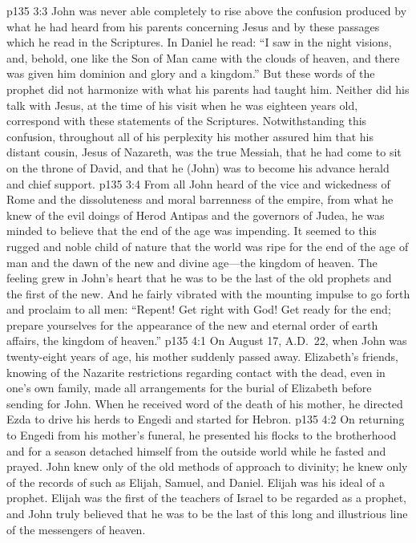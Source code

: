 \pc \vs p135 3:3 John was never able completely to rise above the confusion produced by what he had heard from his parents concerning Jesus and by these passages which he read in the Scriptures. In Daniel he read: “I saw in the night visions, and, behold, one like the Son of Man came with the clouds of heaven, and there was given him dominion and glory and a kingdom.” But these words of the prophet did not harmonize with what his parents had taught him. Neither did his talk with Jesus, at the time of his visit when he was eighteen years old, correspond with these statements of the Scriptures. Notwithstanding this confusion, throughout all of his perplexity his mother assured him that his distant cousin, Jesus of Nazareth, was the true Messiah, that he had come to sit on the throne of David, and that he (John) was to become his advance herald and chief support.
\vs p135 3:4 From all John heard of the vice and wickedness of Rome and the dissoluteness and moral barrenness of the empire, from what he knew of the evil doings of Herod Antipas and the governors of Judea, he was minded to believe that the end of the age was impending. It seemed to this rugged and noble child of nature that the world was ripe for the end of the age of man and the dawn of the new and divine age---the kingdom of heaven. The feeling grew in John’s heart that he was to be the last of the old prophets and the first of the new. And he fairly vibrated with the mounting impulse to go forth and proclaim to all men: “Repent! Get right with God! Get ready for the end; prepare yourselves for the appearance of the new and eternal order of earth affairs, the kingdom of heaven.”
\vs p135 4:1 On August 17, A.D.~22, when John was twenty\hyp{}eight years of age, his mother suddenly passed away. Elizabeth’s friends, knowing of the Nazarite restrictions regarding contact with the dead, even in one’s own family, made all arrangements for the burial of Elizabeth before sending for John. When he received word of the death of his mother, he directed Ezda to drive his herds to Engedi and started for Hebron.
\vs p135 4:2 On returning to Engedi from his mother’s funeral, he presented his flocks to the brotherhood and for a season detached himself from the outside world while he fasted and prayed. John knew only of the old methods of approach to divinity; he knew only of the records of such as Elijah, Samuel, and Daniel. Elijah was his ideal of a prophet. Elijah was the first of the teachers of Israel to be regarded as a prophet, and John truly believed that he was to be the last of this long and illustrious line of the messengers of heaven.
